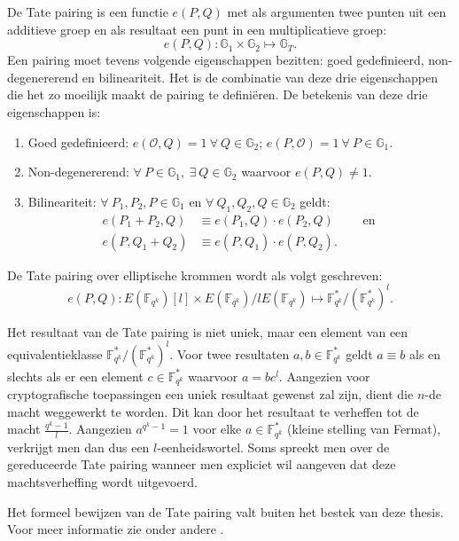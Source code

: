 De Tate pairing is een functie $e(P, Q)$ met als argumenten twee punten uit een additieve groep en als resultaat een punt in een multiplicatieve groep:
\[e(P, Q): \mathbb{G}_1 \times \mathbb{G}_2 \mapsto \mathbb{G}_T.\]
Een pairing moet tevens volgende eigenschappen bezitten: goed gedefinieerd, non-degenererend en bilineariteit. Het is de combinatie van deze drie eigenschappen die het zo moeilijk maakt de pairing te defini\"eren. De betekenis van deze drie eigenschappen is:
\begin{enumerate}
	\item Goed gedefinieerd: $e(\mathcal{O}, Q) = 1 \: \forall \: Q \in \mathbb{G}_2$; $e(P, \mathcal{O}) = 1 \: \forall \: P \in \mathbb{G}_1$.
	
	\item Non-degenererend: $\forall \: P \in \mathbb{G}_1, \: \exists \: Q \in \mathbb{G}_2$ waarvoor $e(P, Q) \neq 1$.
	
	\item Bilineariteit: $\forall \: P_1, P_2, P \in \mathbb{G}_1$ en $\forall \: Q_1, Q_2, Q \in \mathbb{G}_2$ geldt:
		\[\begin{aligned}
			e(P_1 + P_2, Q) &\equiv e(P_1, Q) \cdot e(P_2, Q) \qquad \text{ en }\\
			e(P, Q_1 + Q_2) &\equiv e(P, Q_1) \cdot e(P, Q_2).
		\end{aligned}\]
\end{enumerate}

De Tate pairing over elliptische krommen wordt als volgt geschreven:
\[e(P, Q): E(\mathbb{F}_{q^k})[l] \times E(\mathbb{F}_{q^k})/l E(\mathbb{F}_{q^k}) \mapsto \mathbb{F}_{q^k}^* / (\mathbb{F}_{q^k}^*)^l.\]

Het resultaat van de Tate pairing is niet uniek, maar een element van een equivalentieklasse $\mathbb{F}_{q^k}^* / (\mathbb{F}_{q^k}^*)^l$. Voor twee resultaten $a, b \in \mathbb{F}_{q^k}^*$ geldt $a \equiv b$ als en slechts als er een element $c \in \mathbb{F}_{q^k}^*$ waarvoor $a = bc^l$. Aangezien voor cryptografische toepassingen een uniek resultaat gewenst zal zijn, dient die $n$-de macht weggewerkt te worden. Dit kan door het resultaat te verheffen tot de macht $\frac{q^k - 1 }{l}$. Aangezien $a^{q^k - 1} = 1$ voor elke $a \in \mathbb{F}_{q^k}^*$ (kleine stelling van Fermat), verkrijgt men dan dus een $l$-eenheidswortel. Soms spreekt men over de gereduceerde Tate pairing wanneer men expliciet wil aangeven dat deze machtsverheffing wordt uitgevoerd.

Het formeel bewijzen van de Tate pairing valt buiten het bestek van deze thesis. Voor meer informatie zie onder andere \cite{maas, ruck, hess}.

